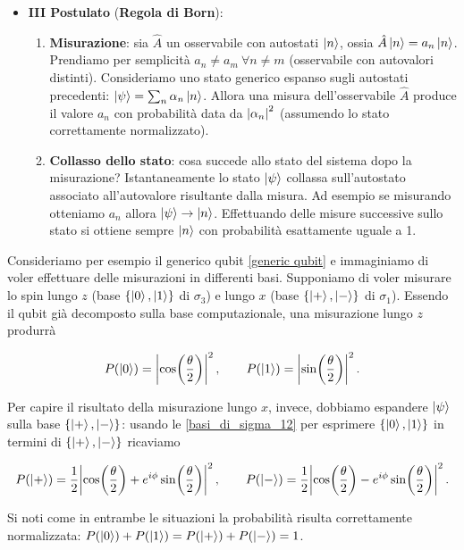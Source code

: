 \begin{itemize}
    \item \textbf{III Postulato} (\textbf{Regola di Born}):
    \begin{enumerate}
        \item \textbf{Misurazione}: sia $\hat{A}$ un osservabile con autostati $\ket{n}$, ossia $\hat{A} \ket{n} = a_n \ket{n}$. Prendiamo per semplicità $a_n \neq a_m \ \forall n \neq m$ (osservabile con autovalori distinti). Consideriamo uno stato generico espanso sugli autostati precedenti: $\ket \psi = \sum_n \alpha_n \ket n$. Allora una misura dell'osservabile $\hat{A}$ produce il valore $a_n$ con probabilità data da $\abs{\alpha_n}^2$ (assumendo lo stato correttamente normalizzato).
        
        \item \textbf{Collasso dello stato}: cosa succede allo stato del sistema dopo la misurazione? Istantaneamente lo stato $\ket \psi$ collassa sull'autostato associato all'autovalore risultante dalla misura. Ad esempio se misurando otteniamo $a_n$ allora $\ket{\psi} \rightarrow \ket{n}$. Effettuando delle misure successive sullo stato si ottiene sempre $\ket{n}$ con probabilità esattamente uguale a 1.  
    \end{enumerate}
\end{itemize}

\begin{esempio}
    Consideriamo per esempio il generico qubit \eqref{generic qubit} e immaginiamo di voler effettuare delle misurazioni in differenti basi. Supponiamo di voler misurare lo spin lungo $z$ (base $\lbrace \ket{0}, \ket{1} \rbrace$ di $\sigma_3$) e lungo $x$ (base $\lbrace \ket{+}, \ket{-} \rbrace$ di $\sigma_1$). Essendo il qubit già decomposto sulla base computazionale, una misurazione lungo $z$ produrrà
    
    \begin{equation*}
        P(\ket{0}) = \abs{\cos \! \left( \frac{\theta}{2} \right)}^2 \, , \qquad P(\ket{1}) = \abs{\sin \! \left( \frac{\theta}{2} \right)}^2 \, .
    \end{equation*}
    
    \noindent Per capire il risultato della misurazione lungo $x$, invece, dobbiamo espandere $\ket{\psi}$ sulla base $\lbrace \ket{+}, \ket{-} \rbrace$: usando le \eqref{basi_di_sigma_12} per esprimere $\lbrace \ket{0}, \ket{1} \rbrace$ in termini di $\lbrace \ket{+}, \ket{-} \rbrace$ ricaviamo
    
    \begin{equation*}
        P(\ket{+}) = \frac{1}{2} \abs{\cos \! \left( \frac{\theta}{2} \right) + e^{i \phi} \sin \! \left( \frac{\theta}{2} \right)}^2 \, , \qquad P(\ket{-}) = \frac{1}{2} \abs{\cos \! \left( \frac{\theta}{2} \right) - e^{i \phi} \sin \! \left( \frac{\theta}{2} \right)}^2 \, .
    \end{equation*}
    
    \noindent Si noti come in entrambe le situazioni la probabilità risulta correttamente normalizzata: $P(\ket{0}) + P(\ket{1}) = P(\ket{+}) + P(\ket{-}) = 1$. 
\end{esempio}

